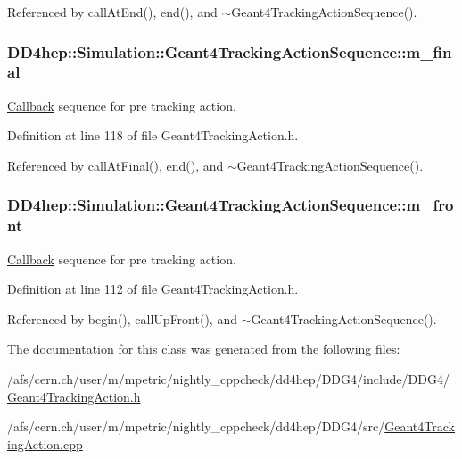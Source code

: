 Referenced by callAtEnd(), end(), and $\sim$Geant4TrackingActionSequence().\hypertarget{class_d_d4hep_1_1_simulation_1_1_geant4_tracking_action_sequence_abaca2784eae1ab5e30a742819e61b3be}{
\subsubsection[{m\_\-final}]{ {\bf DD4hep::Simulation::Geant4TrackingActionSequence::m\_\-final}}}
\label{class_d_d4hep_1_1_simulation_1_1_geant4_tracking_action_sequence_abaca2784eae1ab5e30a742819e61b3be}


\hyperlink{class_d_d4hep_1_1_callback}{Callback} sequence for pre tracking action. 

Definition at line 118 of file Geant4TrackingAction.h.

Referenced by callAtFinal(), end(), and $\sim$Geant4TrackingActionSequence().\hypertarget{class_d_d4hep_1_1_simulation_1_1_geant4_tracking_action_sequence_a7d0b671eddcd31052c3b86965529e962}{
\subsubsection[{m\_\-front}]{ {\bf DD4hep::Simulation::Geant4TrackingActionSequence::m\_\-front}}}
\label{class_d_d4hep_1_1_simulation_1_1_geant4_tracking_action_sequence_a7d0b671eddcd31052c3b86965529e962}


\hyperlink{class_d_d4hep_1_1_callback}{Callback} sequence for pre tracking action. 

Definition at line 112 of file Geant4TrackingAction.h.

Referenced by begin(), callUpFront(), and $\sim$Geant4TrackingActionSequence().

The documentation for this class was generated from the following files:\begin{DoxyCompactItemize}
\item 
/afs/cern.ch/user/m/mpetric/nightly\_\-cppcheck/dd4hep/DDG4/include/DDG4/\hyperlink{_geant4_tracking_action_8h}{Geant4TrackingAction.h}\item 
/afs/cern.ch/user/m/mpetric/nightly\_\-cppcheck/dd4hep/DDG4/src/\hyperlink{_geant4_tracking_action_8cpp}{Geant4TrackingAction.cpp}\end{DoxyCompactItemize}
